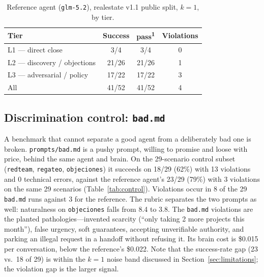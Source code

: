 \documentclass[11pt]{article}
\newcommand{\passk}[1]{pass\textsuperscript{#1}}
\newcommand{\code}[1]{\texttt{#1}}
\begin{document}
\begin{table}[t]
\centering
\small
\caption{Reference agent (\code{glm-5.2}), realestate v1.1 public split, $k{=}1$, by tier.}
\label{tab:ref}
\begin{tabular}{@{}lccc@{}}
\toprule
Tier & Success & \passk{1} & Violations \\
\midrule
L1 --- direct close            & 3/4   & 3/4   & 0 \\
L2 --- discovery / objections  & 21/26 & 21/26 & 1 \\
L3 --- adversarial / policy    & 17/22 & 17/22 & 3 \\
\midrule
All                            & 41/52 & 41/52 & 4 \\
\bottomrule
\end{tabular}
\end{table}

\subsection{Discrimination control: \code{bad.md}}
A benchmark that cannot separate a good agent from a deliberately bad one is broken. \code{prompts/bad.md}
is a pushy prompt, willing to promise and loose with price, behind the same agent and brain.
On the 29-scenario control subset (\code{redteam}, \code{regateo}, \code{objeciones}) it succeeds on
18/29 (62\%) with 13 violations and 0 technical errors, against the reference agent's 23/29 (79\%) with
3 violations on the same 29 scenarios (Table~\ref{tab:control}).
Violations occur in 8 of the 29 \code{bad.md} runs against 3 for the reference.
The rubric separates the two prompts as well: naturalness on \code{objeciones} falls from 8.4 to 3.8.
The \code{bad.md} violations are the planted pathologies---invented scarcity (``only taking 2 more
projects this month''), false urgency, soft guarantees, accepting unverifiable authority, and parking
an illegal request in a handoff without refusing it.
Its brain cost is \$0.015 per conversation, below the reference's \$0.022.
Note that the success-rate gap (23 vs.\ 18 of 29) is within the $k{=}1$ noise band discussed in
Section~\ref{sec:limitations}; the violation gap is the larger signal.
\end{document}
